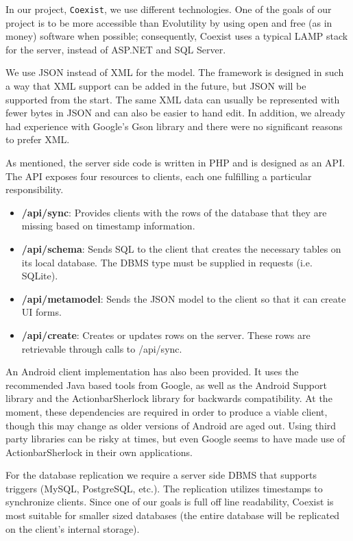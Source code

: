 In our project, \texttt{Coexist}, we use different technologies. One of
the goals of our project is to be more accessible than Evolutility by using open
and free (as in money) software when possible; consequently, Coexist uses a
typical LAMP stack for the server, instead of ASP.NET and SQL Server.

We use JSON instead of XML for the model. The framework is designed in such a
way that XML support can be added in the future, but JSON will be supported from
the start. The same XML data can usually be represented with fewer bytes in JSON
and can also be easier to hand edit. In addition, we already had experience with
Google's Gson library and there were no significant reasons to prefer XML.

As mentioned, the server side code is written in PHP and is designed as an API.
The API exposes four resources to clients, each one fulfilling a particular
responsibility.

\begin{itemize}
\item \textbf{/api/sync}: Provides clients with the rows of the database that they are missing based on timestamp information.
\item \textbf{/api/schema}: Sends SQL to the client that creates the necessary tables on its local database. The DBMS type must be supplied in requests (i.e. SQLite).
\item \textbf{/api/metamodel}: Sends the JSON model to the client so that it can create UI forms.
\item \textbf{/api/create}: Creates or updates rows on the server. These rows are retrievable through calls to /api/sync.
\end{itemize}

An Android client implementation has also been provided. It uses the recommended
Java based tools from Google, as well as the Android Support library and the
ActionbarSherlock library\cite{wharton_actionbarsherlock_????} for backwards
compatibility. At the moment, these dependencies are required in order to
produce a viable client, though this may change as older versions of Android are
aged out. Using third party libraries can be risky at times, but even Google
seems to have made use of ActionbarSherlock in their own
applications\cite{google_baseactivity.java_????}.

For the database replication we require a server side DBMS that supports
triggers (MySQL, PostgreSQL, etc.). The replication utilizes timestamps to
synchronize clients. Since one of our goals is full off line readability,
Coexist is most suitable for smaller sized databases (the entire database will
be replicated on the client's internal storage).


